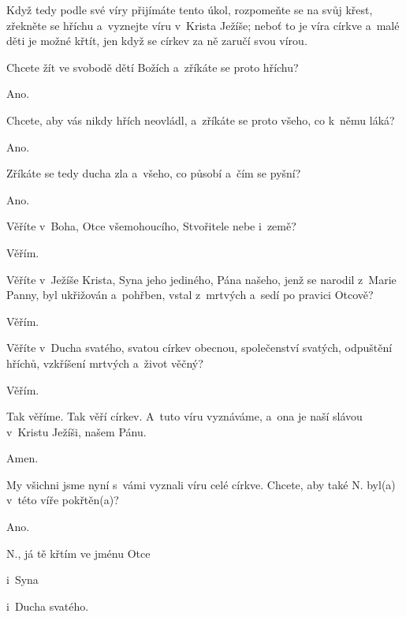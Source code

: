 Když tedy podle své víry přijímáte tento úkol, rozpomeňte se na svůj křest,
zřekněte se hříchu a~vyznejte víru v~Krista Ježíše; neboť to je víra církve
a~malé děti je možné křtít, jen když se církev za ně zaručí svou vírou.

 Chcete žít ve svobodě dětí Božích a~zříkáte se proto hříchu?

 Ano.

 Chcete, aby vás nikdy hřích neovládl,
a~zříkáte se proto všeho, co k~němu láká?

 Ano.

 Zříkáte se tedy ducha zla a~všeho, co působí a~čím se pyšní?

 Ano.


Věříte v~Boha, Otce všemohoucího, Stvořitele nebe i~země?

 Věřím.

 Věříte v~Ježíše Krista, Syna jeho jediného, Pána našeho,
jenž se narodil z~Marie Panny, byl ukřižován a~pohřben, vstal z~mrtvých a~sedí po pravici Otcově?

 Věřím.

 Věříte v~Ducha svatého, svatou církev obecnou, společenství svatých,
odpuštění hříchů, vzkříšení mrtvých a~život věčný?

 Věřím.

 Tak věříme. Tak věří církev. A~tuto víru vyznáváme,
a~ona je naší slávou v~Kristu Ježíši, našem Pánu.

 Amen.

\pars{}


My všichni jsme nyní s~vámi vyznali víru celé církve. Chcete,
aby také {\color{red}N.} byl(a) v~této víře pokřtěn(a)?

 Ano.


{\color{red}N.}, já tě křtím ve jménu Otce


i~Syna


i~Ducha svatého.

